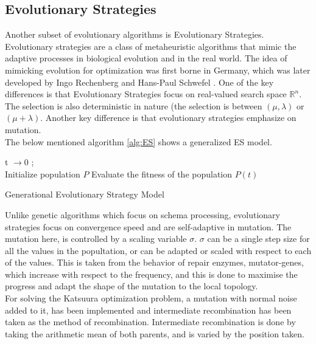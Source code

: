 \documentclass{article}
\begin{document}
\subsection{Evolutionary Strategies}
Another subset of evolutionary algorithms is Evolutionary Strategies. Evolutionary strategies are a class of metaheuristic algorithms that mimic the adaptive processes in biological evolution and in the real world. The idea of mimicking evolution for optimization was first borne in Germany, which was later developed by Ingo Rechenberg \cite{source_evo1} and Hans-Paul Schwefel \cite{source-evo2}. One of the key differences is that Evolutionary Strategies focus on real-valued search space $\mathbb{R}^n$. The selection is also deterministic in nature (the selection is between $(\mu, \lambda)$ or  $(\mu + \lambda)$. Another key difference is that evolutionary strategies emphasize on mutation. \\
The below mentioned algorithm \ref{alg:ES} shows a generalized ES model. \\
\begin{algorithm}[H]
\SetAlgoLined
{}
\BlankLine
 t $\rightarrow 0 $ ;\\
Initialize population $P$\;
Evaluate the fitness of the population $P(t)$\;
\caption{Generational Evolutionary Strategy Model}\label{alg:ES}
\end{algorithm}

Unlike genetic algorithms which focus on schema processing, evolutionary strategies focus on convergence speed and are self-adaptive in mutation. The mutation here, is controlled by a scaling variable $\sigma$. $\sigma$ can be a single step size for all the values in the popultation, or can be adapted or scaled with respect to each of the values.  This is taken from the behavior of repair enzymes, mutator-genes, which increase with respect to the frequency, and this is done to maximise the progress and adapt the shape of the mutation to the local topology. \cite{hao-paper-evostrat} \\
For solving the Katsuura optimization problem, a mutation with normal noise added to it, has been implemented and intermediate recombination has been taken as the method of recombination. Intermediate recombination is done by taking the arithmetic mean of both parents, and is varied by the position taken.
\end{document}
